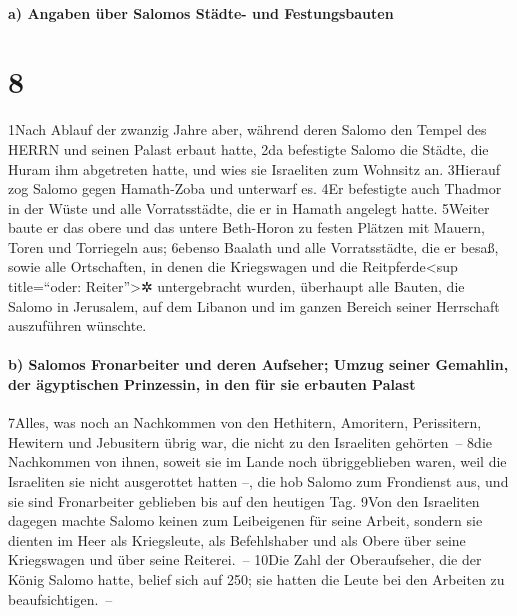 \hypertarget{a-angaben-uxfcber-salomos-stuxe4dte--und-festungsbauten}{%
\paragraph{a) Angaben über Salomos Städte- und
Festungsbauten}\label{a-angaben-uxfcber-salomos-stuxe4dte--und-festungsbauten}}

\hypertarget{section-7}{%
\section{8}\label{section-7}}

1Nach Ablauf der zwanzig Jahre aber, während deren Salomo den Tempel des
HERRN und seinen Palast erbaut hatte, 2da befestigte Salomo die Städte,
die Huram ihm abgetreten hatte, und wies sie Israeliten zum Wohnsitz an.
3Hierauf zog Salomo gegen Hamath-Zoba und unterwarf es. 4Er befestigte
auch Thadmor in der Wüste und alle Vorratsstädte, die er in Hamath
angelegt hatte. 5Weiter baute er das obere und das untere Beth-Horon zu
festen Plätzen mit Mauern, Toren und Torriegeln aus; 6ebenso Baalath und
alle Vorratsstädte, die er besaß, sowie alle Ortschaften, in denen die
Kriegswagen und die Reitpferde\textless sup title=``oder:
Reiter''\textgreater✲ untergebracht wurden, überhaupt alle Bauten, die
Salomo in Jerusalem, auf dem Libanon und im ganzen Bereich seiner
Herrschaft auszuführen wünschte.

\hypertarget{b-salomos-fronarbeiter-und-deren-aufseher-umzug-seiner-gemahlin-der-uxe4gyptischen-prinzessin-in-den-fuxfcr-sie-erbauten-palast}{%
\paragraph{b) Salomos Fronarbeiter und deren Aufseher; Umzug seiner
Gemahlin, der ägyptischen Prinzessin, in den für sie erbauten
Palast}\label{b-salomos-fronarbeiter-und-deren-aufseher-umzug-seiner-gemahlin-der-uxe4gyptischen-prinzessin-in-den-fuxfcr-sie-erbauten-palast}}

7Alles, was noch an Nachkommen von den Hethitern, Amoritern,
Perissitern, Hewitern und Jebusitern übrig war, die nicht zu den
Israeliten gehörten~-- 8die Nachkommen von ihnen, soweit sie im Lande
noch übriggeblieben waren, weil die Israeliten sie nicht ausgerottet
hatten --, die hob Salomo zum Frondienst aus, und sie sind Fronarbeiter
geblieben bis auf den heutigen Tag. 9Von den Israeliten dagegen machte
Salomo keinen zum Leibeigenen für seine Arbeit, sondern sie dienten im
Heer als Kriegsleute, als Befehlshaber und als Obere über seine
Kriegswagen und über seine Reiterei.~-- 10Die Zahl der Oberaufseher, die
der König Salomo hatte, belief sich auf 250; sie hatten die Leute bei
den Arbeiten zu beaufsichtigen.~--

